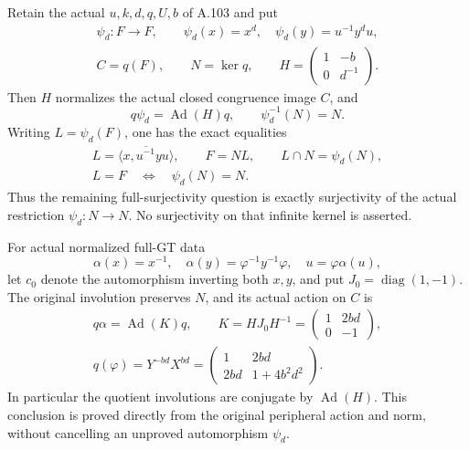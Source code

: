Retain the actual \(u,k,d,q,U,b\) of A.103 and put
\[
 \begin{gathered}
 \psi_d:F\longrightarrow F,\qquad
 \psi_d(x)=x^d,\quad \psi_d(y)=u^{-1}y^du,\\
 C=q(F),\qquad N=\ker q,\qquad
 H=\begin{pmatrix}1&-b\\0&d^{-1}\end{pmatrix}.
 \end{gathered}
 \tag{A.104.1}
\]
Then \(H\) normalizes the actual closed congruence image \(C\), and
\[
 q\psi_d=\operatorname{Ad}(H)q,\qquad
 \psi_d^{-1}(N)=N.
 \tag{A.104.2}
\]
Writing \(L=\psi_d(F)\), one has the exact equalities
\[
 \begin{gathered}
 L=\overline{\langle x,u^{-1}yu\rangle},\qquad
 F=NL,\qquad L\cap N=\psi_d(N),\\
 L=F\quad\Longleftrightarrow\quad \psi_d(N)=N.
 \end{gathered}
 \tag{A.104.3}
\]
Thus the remaining full-surjectivity question is exactly
surjectivity of the actual restriction \(\psi_d:N\to N\).
No surjectivity on that infinite kernel is asserted.

For actual normalized full-GT data
\[
 \alpha(x)=x^{-1},\quad
 \alpha(y)=\varphi^{-1}y^{-1}\varphi,\quad
 u=\varphi\alpha(u),
 \tag{A.104.4}
\]
let \(c_0\) denote the automorphism inverting both \(x,y\), and put
\(J_0=\operatorname{diag}(1,-1)\).
The original involution preserves \(N\), and its actual action on
\(C\) is
\[
 \begin{gathered}
 q\alpha=\operatorname{Ad}(K)q,\qquad
 K=HJ_0H^{-1}=\begin{pmatrix}1&2bd\\0&-1\end{pmatrix},\\
 q(\varphi)=Y^{-bd}X^{bd}
       =\begin{pmatrix}1&2bd\\2bd&1+4b^2d^2\end{pmatrix}.
 \end{gathered}
 \tag{A.104.5}
\]
In particular the quotient involutions are conjugate by
\(\operatorname{Ad}(H)\). This conclusion is proved directly from
the original peripheral action and norm, without cancelling an
unproved automorphism \(\psi_d\).

